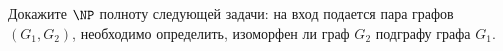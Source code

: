 Докажите $\NP$ полноту следующей задачи: на вход подается пара графов $(G_1, G_2)$, необходимо определить, изоморфен ли граф
$G_2$ подграфу графа $G_1$.